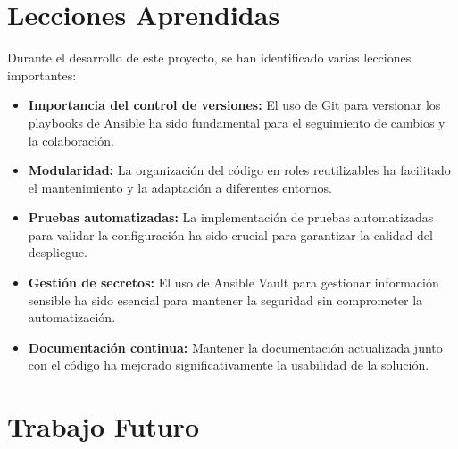 \documentclass[12pt,a4paper]{report}
\begin{document}
\section{Lecciones Aprendidas}

Durante el desarrollo de este proyecto, se han identificado varias lecciones importantes:

\begin{itemize}
    \item[\textcolor{cientigo-blue}{\faLightbulb}] \textbf{Importancia del control de versiones:} El uso de Git para versionar los playbooks de Ansible ha sido fundamental para el seguimiento de cambios y la colaboración.
    
    \item[\textcolor{cientigo-blue}{\faLightbulb}] \textbf{Modularidad:} La organización del código en roles reutilizables ha facilitado el mantenimiento y la adaptación a diferentes entornos.
    
    \item[\textcolor{cientigo-blue}{\faLightbulb}] \textbf{Pruebas automatizadas:} La implementación de pruebas automatizadas para validar la configuración ha sido crucial para garantizar la calidad del despliegue.
    
    \item[\textcolor{cientigo-blue}{\faLightbulb}] \textbf{Gestión de secretos:} El uso de Ansible Vault para gestionar información sensible ha sido esencial para mantener la seguridad sin comprometer la automatización.
    
    \item[\textcolor{cientigo-blue}{\faLightbulb}] \textbf{Documentación continua:} Mantener la documentación actualizada junto con el código ha mejorado significativamente la usabilidad de la solución.
\end{itemize}

\section{Trabajo Futuro}
\end{document}
